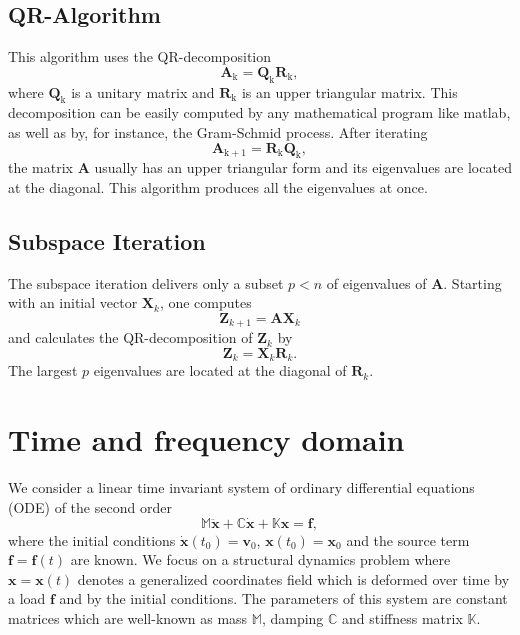 \documentclass[conference]{journal}
\newcommand{\bb}[1]{\mathbb{#1}}
\newcommand{\B}[1]{\mathbf{#1}}
\newcommand{\Bx}{\B{x}}
\newcommand{\M}{\bb{M}}
\newcommand{\C}{\bb{C}}
\newcommand{\K}{\bb{K}}
\begin{document}
	\subsection*{QR-Algorithm}
	This algorithm uses the QR-decomposition
	\begin{equation}
	\textbf{A}_\mathrm{k}={\textbf{Q}_\mathrm{k}}{\textbf{R}_\mathrm{k}},
	\end{equation}
	where $\textbf{Q}_\mathrm{k}$ is a unitary matrix and $\textbf{R}_\mathrm{k}$ is an upper triangular matrix.
	This decomposition can be easily computed by any mathematical program like matlab, as well as by, for instance, the Gram-Schmid process. After iterating
	\begin{equation}
	\textbf{A}_\mathrm{k+1}={\textbf{R}_\mathrm{k}}{\textbf{Q}_\mathrm{k}},
	\end{equation}
	the matrix $\textbf{A}$ usually has an upper triangular form and its eigenvalues are located at the diagonal. This algorithm produces all the eigenvalues at once.
	 
	\subsection*{Subspace Iteration}
	The subspace iteration delivers only a subset $p<n$ of eigenvalues of $\textbf{A}$. Starting with an initial vector $\textbf{X}_k$, one computes
	\begin{equation}
	\textbf{Z}_{k+1}=\textbf{AX}_k
	\end{equation}
	and calculates the QR-decomposition of $\textbf{Z}_k$ by
	\begin{equation}
	\textbf{Z}_k=\textbf{X}_k\textbf{R}_k.
	\end{equation}
	The largest $p$ eigenvalues are located at the diagonal of $\textbf{R}_k$.
	
	
	
	\section{Time and frequency domain}
	We consider a linear time invariant system of ordinary differential equations (ODE) of the second order
	\begin{equation} \label{eq:2system}
	\M \ddot{\Bx} + \C \dot{\Bx} + \K \Bx = \B{f},
	\end{equation}
	where the initial conditions $\dot{\Bx}(t_0)=\B{v}_0$, $\Bx(t_0)=\Bx_0$ and the source term $\B{f}=\B{f}(t)$ are known. We focus on a structural dynamics problem where $\Bx=\Bx(t)$ denotes a generalized coordinates field which is deformed over time by a load $\B{f}$ and by the initial conditions. The parameters of this system are constant matrices which are well-known as mass $\M$, damping $\C$ and stiffness matrix $\K$.
\end{document}
